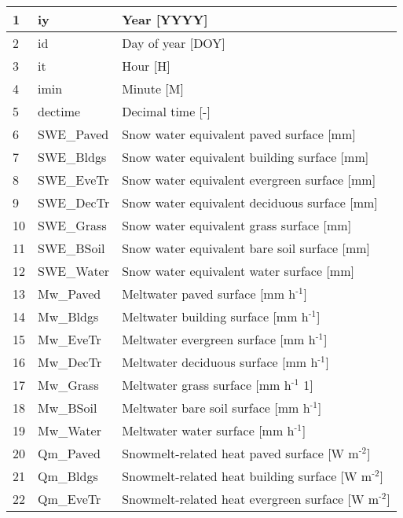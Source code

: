 \documentclass[letterpaper,10pt,english]{sphinxmanual}
\begin{document}
\begin{savenotes}
\begin{longtable}{|l|l|l|}
1
&
iy
&
Year {[}YYYY{]}
\\
\hline
2
&
id
&
Day of year {[}DOY{]}
\\
\hline
3
&
it
&
Hour {[}H{]}
\\
\hline
4
&
imin
&
Minute {[}M{]}
\\
\hline
5
&
dectime
&
Decimal time {[}-{]}
\\
\hline
6
&
SWE\_Paved
&
Snow water equivalent \textendash{} paved surface {[}mm{]}
\\
\hline
7
&
SWE\_Bldgs
&
Snow water equivalent \textendash{} building surface {[}mm{]}
\\
\hline
8
&
SWE\_EveTr
&
Snow water equivalent \textendash{} evergreen surface {[}mm{]}
\\
\hline
9
&
SWE\_DecTr
&
Snow water equivalent \textendash{} deciduous surface {[}mm{]}
\\
\hline
10
&
SWE\_Grass
&
Snow water equivalent \textendash{} grass surface {[}mm{]}
\\
\hline
11
&
SWE\_BSoil
&
Snow water equivalent \textendash{} bare soil surface {[}mm{]}
\\
\hline
12
&
SWE\_Water
&
Snow water equivalent \textendash{} water surface {[}mm{]}
\\
\hline
13
&
Mw\_Paved
&
Meltwater \textendash{} paved surface {[}mm h$^{\text{-1}}${]}
\\
\hline
14
&
Mw\_Bldgs
&
Meltwater \textendash{} building surface {[}mm h$^{\text{-1}}${]}
\\
\hline
15
&
Mw\_EveTr
&
Meltwater \textendash{} evergreen surface {[}mm h$^{\text{-1}}${]}
\\
\hline
16
&
Mw\_DecTr
&
Meltwater \textendash{} deciduous surface {[}mm h$^{\text{-1}}${]}
\\
\hline
17
&
Mw\_Grass
&
Meltwater \textendash{} grass surface {[}mm h$^{\text{-1}}$ 1{]}
\\
\hline
18
&
Mw\_BSoil
&
Meltwater \textendash{} bare soil surface {[}mm h$^{\text{-1}}${]}
\\
\hline
19
&
Mw\_Water
&
Meltwater \textendash{} water surface {[}mm h$^{\text{-1}}${]}
\\
\hline
20
&
Qm\_Paved
&
Snowmelt-related heat \textendash{} paved surface {[}W m$^{\text{-2}}${]}
\\
\hline
21
&
Qm\_Bldgs
&
Snowmelt-related heat \textendash{} building surface {[}W m$^{\text{-2}}${]}
\\
\hline
22
&
Qm\_EveTr
&
Snowmelt-related heat \textendash{} evergreen surface {[}W m$^{\text{-2}}${]}
\\

\end{longtable}
\end{savenotes}
\end{document}

